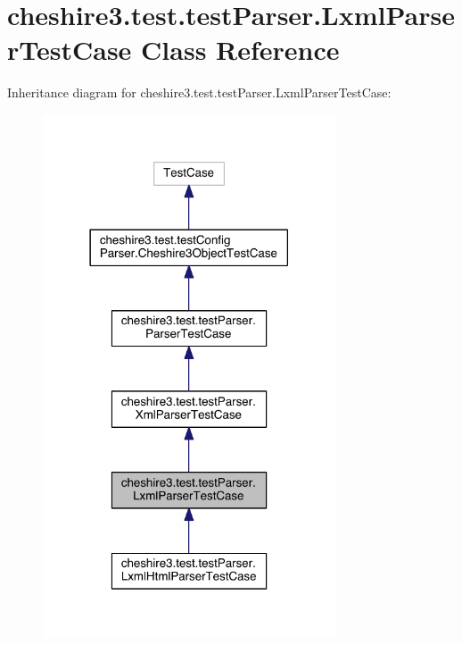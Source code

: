 \hypertarget{classcheshire3_1_1test_1_1test_parser_1_1_lxml_parser_test_case}{\section{cheshire3.\-test.\-test\-Parser.\-Lxml\-Parser\-Test\-Case Class Reference}
\label{classcheshire3_1_1test_1_1test_parser_1_1_lxml_parser_test_case}
}


Inheritance diagram for cheshire3.\-test.\-test\-Parser.\-Lxml\-Parser\-Test\-Case\-:
\nopagebreak
\begin{figure}[H]
\begin{center}
\leavevmode
\includegraphics[width=246pt]{classcheshire3_1_1test_1_1test_parser_1_1_lxml_parser_test_case__inherit__graph}
\end{center}
\end{figure}



